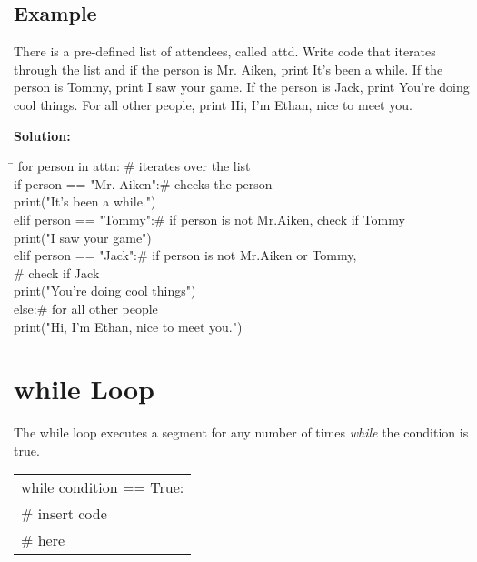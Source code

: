 \documentclass{article}
\newcommand{\icode}[1]{{\ttfamily #1}}
\newenvironment{code}{\begin{tcolorbox}\ttfamily}{\end{tcolorbox}}
\begin{document}
\subsection{Example}
There is a pre-defined list of attendees, called \icode{attd}. Write code that iterates through the list and if the person is Mr. Aiken, print \icode{It's been a while.} If the person is Tommy, print \icode{I saw your game}. If the person is Jack, print \icode{You're doing cool things}. For all other people, print \icode{Hi, I'm Ethan, nice to meet you.}

\noindent \textbf{Solution:}

\begin{code}
	\begin{tabbing}
		\hspace{8 cm} \= \hspace{3 cm} \kill 
		for person in attn: \>\# iterates over the list\\
		\hspace{2 em}if person == "Mr. Aiken":\>\# checks the person\\
		\hspace{4 em}print("It's been a while.")\\
		\hspace{2 em}elif person == "Tommy":\>\# if person is not Mr.Aiken, check if Tommy\\
		\hspace{4 em}print("I saw your game")\\
		\hspace{2 em}elif person == "Jack":\>\# if person is not Mr.Aiken or Tommy,\\ \>\# check if Jack\\
		\hspace{4 em}print("You're doing cool things")\\
		\hspace{2 em}else:\>\# for all other people\\
		\hspace{4 em}print("Hi, I'm Ethan, nice to meet you.")
	\end{tabbing}
\end{code}

\section{\icode{while} Loop}
The \icode{while} loop executes a segment for any number of times \textit{while} the condition is true. 

\begin{center} \ttfamily
	\begin{tabular}{|l}
		while condition == True:\\
		\hspace{2 em}\# insert code\\
		\hspace{2 em}\# here
	\end{tabular}
\end{center}
\end{document}
